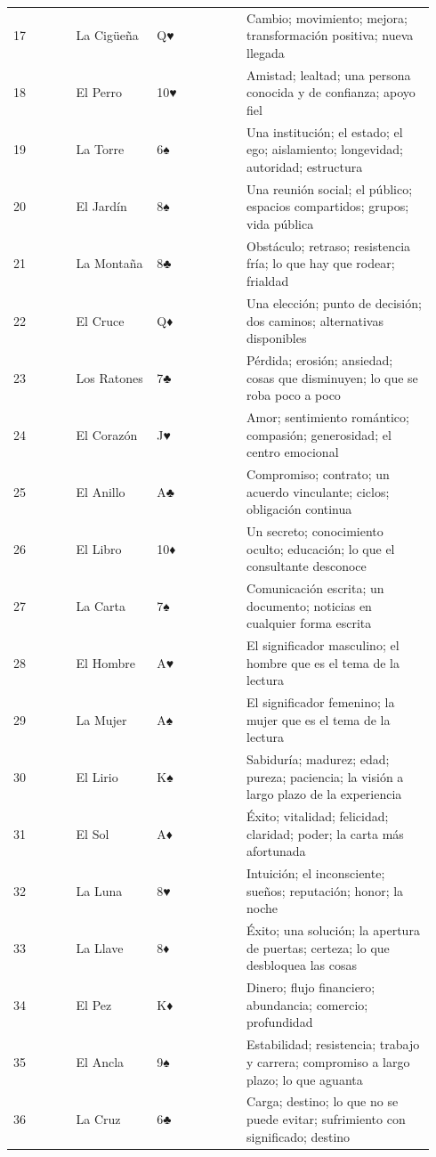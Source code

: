 \begin{longtable}[]{@{}>{\RaggedRight\small}p{0.14\linewidth}>{\RaggedRight\small}p{0.18\linewidth}>{\RaggedRight\small}p{0.20\linewidth}>{\RaggedRight\small}p{0.42\linewidth}@{}}
17 & La Cigüeña & Q♥ & Cambio; movimiento; mejora; transformación positiva; nueva llegada \\
18 & El Perro & 10♥ & Amistad; lealtad; una persona conocida y de confianza; apoyo fiel \\
19 & La Torre & 6♠ & Una institución; el estado; el ego; aislamiento; longevidad; autoridad; estructura \\
20 & El Jardín & 8♠ & Una reunión social; el público; espacios compartidos; grupos; vida pública \\
21 & La Montaña & 8♣ & Obstáculo; retraso; resistencia fría; lo que hay que rodear; frialdad \\
22 & El Cruce & Q♦ & Una elección; punto de decisión; dos caminos; alternativas disponibles \\
23 & Los Ratones & 7♣ & Pérdida; erosión; ansiedad; cosas que disminuyen; lo que se roba poco a poco \\
24 & El Corazón & J♥ & Amor; sentimiento romántico; compasión; generosidad; el centro emocional \\
25 & El Anillo & A♣ & Compromiso; contrato; un acuerdo vinculante; ciclos; obligación continua \\
26 & El Libro & 10♦ & Un secreto; conocimiento oculto; educación; lo que el consultante desconoce \\
27 & La Carta & 7♠ & Comunicación escrita; un documento; noticias en cualquier forma escrita \\
28 & El Hombre & A♥ & El significador masculino; el hombre que es el tema de la lectura \\
29 & La Mujer & A♠ & El significador femenino; la mujer que es el tema de la lectura \\
30 & El Lirio & K♠ & Sabiduría; madurez; edad; pureza; paciencia; la visión a largo plazo de la experiencia \\
31 & El Sol & A♦ & Éxito; vitalidad; felicidad; claridad; poder; la carta más afortunada \\
32 & La Luna & 8♥ & Intuición; el inconsciente; sueños; reputación; honor; la noche \\
33 & La Llave & 8♦ & Éxito; una solución; la apertura de puertas; certeza; lo que desbloquea las cosas \\
34 & El Pez & K♦ & Dinero; flujo financiero; abundancia; comercio; profundidad \\
35 & El Ancla & 9♠ & Estabilidad; resistencia; trabajo y carrera; compromiso a largo plazo; lo que aguanta \\
36 & La Cruz & 6♣ & Carga; destino; lo que no se puede evitar; sufrimiento con significado; destino \\
\end{longtable}

